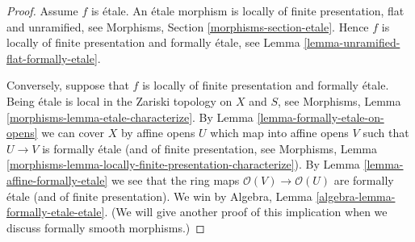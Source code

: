 \documentclass[10pt,a4paper]{amsart}
\theoremstyle{plain}
\theoremstyle{definition}
\theoremstyle{remark}
\numberwithin{equation}{subsection}
\begin{document}
\begin{proof}
Assume $f$ is \'etale.
An \'etale morphism is locally of finite presentation, flat and unramified, see
Morphisms, Section \ref{morphisms-section-etale}.
Hence $f$ is locally of finite presentation and formally \'etale, see
Lemma \ref{lemma-unramified-flat-formally-etale}.

\medskip\noindent
Conversely, suppose that $f$ is locally of finite presentation and
formally \'etale. Being \'etale is local in the Zariski topology on
$X$ and $S$, see
Morphisms, Lemma \ref{morphisms-lemma-etale-characterize}.
By
Lemma \ref{lemma-formally-etale-on-opens}
we can cover $X$ by affine opens $U$ which map into affine opens
$V$ such that $U \to V$ is formally \'etale (and of finite presentation, see
Morphisms,
Lemma \ref{morphisms-lemma-locally-finite-presentation-characterize}).
By
Lemma \ref{lemma-affine-formally-etale}
we see that the ring maps $\mathcal{O}(V) \to \mathcal{O}(U)$ are
formally \'etale (and of finite presentation).
We win by
Algebra, Lemma \ref{algebra-lemma-formally-etale-etale}.
(We will give another proof of this implication when we discuss
formally smooth morphisms.)
\end{proof}
\end{document}
